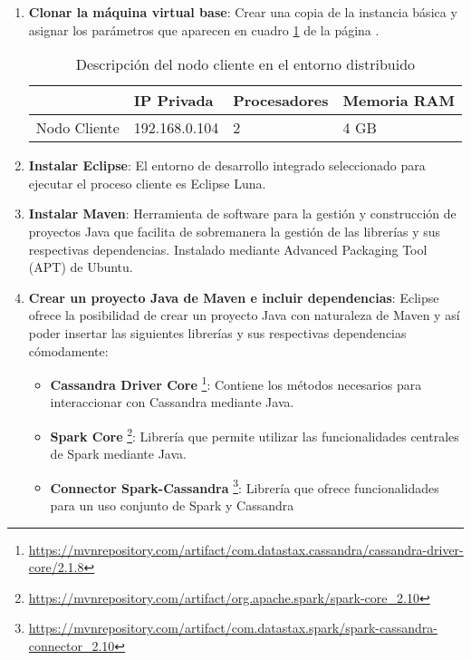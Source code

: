 \begin{enumerate}
	
	\item \textbf{Clonar la máquina virtual base}: Crear una copia de la instancia básica y asignar los parámetros que aparecen en cuadro \ref{nodo-cliente-cluster} de la página \pageref{nodo-cliente-cluster}.
	
	\begin{table}[h!]
		\centering
		\begin{tabular}{|l||l|l|l|}
			
			\hline
			
			& \textbf{IP Privada} & \textbf{Procesadores} & \textbf{Memoria RAM} \\
			
			\hline
			\hline
			
			Nodo Cliente & 192.168.0.104 & 2 & 4 GB \\
			
			\hline
			
		\end{tabular}
		\caption{Descripción del nodo cliente en el entorno distribuido}
		\label{nodo-cliente-cluster}
	\end{table}
	
	\item \textbf{Instalar Eclipse}: El entorno de desarrollo integrado seleccionado para ejecutar el proceso cliente es Eclipse Luna.
	
	\item \textbf{Instalar Maven}: Herramienta de software para la gestión y construcción de proyectos Java que facilita de sobremanera la gestión de las librerías y sus respectivas dependencias. Instalado mediante Advanced Packaging Tool (APT) de Ubuntu.

	\item \textbf{Crear un proyecto Java de Maven e incluir dependencias}: Eclipse ofrece la posibilidad de crear un proyecto Java con naturaleza de Maven y así poder insertar las siguientes librerías y sus respectivas dependencias cómodamente:
	
	\begin{itemize}
		\item \textbf{Cassandra Driver Core} \footnote{\url{https://mvnrepository.com/artifact/com.datastax.cassandra/cassandra-driver-core/2.1.8}}: Contiene los métodos necesarios para interaccionar con Cassandra mediante Java.
		\item \textbf{Spark Core} \footnote{\url{https://mvnrepository.com/artifact/org.apache.spark/spark-core_2.10}}: Librería que permite utilizar las funcionalidades centrales de Spark mediante Java.
		\item \textbf{Connector Spark-Cassandra} \footnote{\url{https://mvnrepository.com/artifact/com.datastax.spark/spark-cassandra-connector_2.10}}: Librería que ofrece funcionalidades para un uso conjunto de Spark y Cassandra  
	\end{itemize}
	
\end{enumerate}